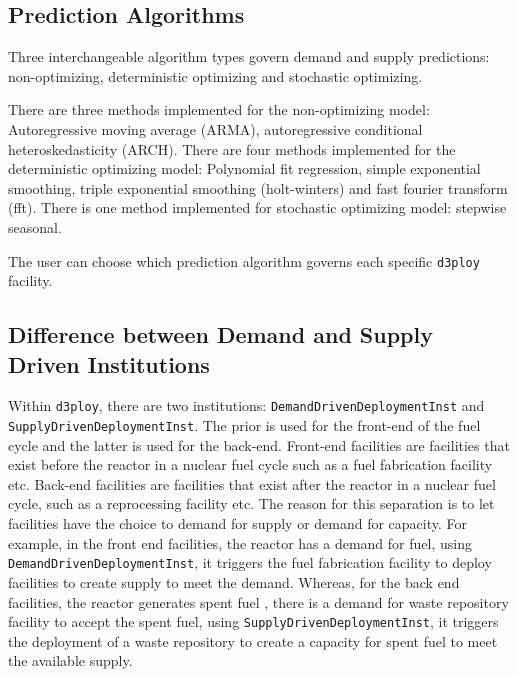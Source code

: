 \documentclass[11pt,letterpaper]{article}
\newcommand{\deploy}{\texttt{d3ploy}\xspace}%
\begin{document}
\subsection{Prediction Algorithms}
Three interchangeable algorithm types govern demand and supply 
predictions: non-optimizing, deterministic optimizing and stochastic
optimizing. 

There are three methods implemented for the non-optimizing model: 
Autoregressive moving average (ARMA), autoregressive 
conditional heteroskedasticity (ARCH).
There are four methods implemented for the deterministic optimizing model: 
Polynomial fit regression, simple exponential smoothing,  
triple exponential smoothing (holt-winters) and fast fourier 
transform (fft). 
There is one method implemented for stochastic optimizing model: 
stepwise seasonal.  

The user can choose which prediction algorithm governs each specific 
\deploy facility. 

\subsection{Difference between Demand and Supply Driven Institutions}
Within \deploy, there are two institutions: 
\texttt{DemandDrivenDeploymentInst} and \texttt{SupplyDrivenDeploymentInst}. 
The prior is used for the front-end of the fuel cycle and the latter is used 
for the back-end. 
Front-end facilities are facilities that exist before the reactor 
in a nuclear fuel cycle such as a fuel fabrication facility etc. 
Back-end facilities are facilities that exist after the reactor in a nuclear 
fuel cycle, such as a reprocessing facility etc. 
The reason for this separation is to let facilities have the choice 
to demand for supply or demand for capacity. 
For example, in the front end facilities, the reactor has a demand for 
fuel, using \texttt{DemandDrivenDeploymentInst}, it triggers the fuel 
fabrication facility to deploy facilities to create supply to meet 
the demand. 
Whereas, for the back end facilities, the reactor generates spent fuel 
, there is a demand for waste repository facility to accept the 
spent fuel, using \texttt{SupplyDrivenDeploymentInst}, it triggers the
deployment of a waste repository to create a capacity for spent fuel 
to meet the available supply. 
\end{document}

